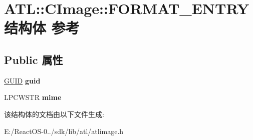 \hypertarget{struct_a_t_l_1_1_c_image_1_1_f_o_r_m_a_t___e_n_t_r_y}{}\section{A\+TL\+:\+:C\+Image\+:\+:F\+O\+R\+M\+A\+T\+\_\+\+E\+N\+T\+R\+Y结构体 参考}
\label{struct_a_t_l_1_1_c_image_1_1_f_o_r_m_a_t___e_n_t_r_y}
\subsection*{Public 属性}
\begin{DoxyCompactItemize}
\item 
\mbox{\label{struct_a_t_l_1_1_c_image_1_1_f_o_r_m_a_t___e_n_t_r_y_a31ce8a0d825a0e8574058a939a756bd2}} 
\hyperlink{interface_g_u_i_d}{G\+U\+ID} {\bfseries guid}
\item 
\mbox{\label{struct_a_t_l_1_1_c_image_1_1_f_o_r_m_a_t___e_n_t_r_y_ac5ea5c625100d24f097cd65be977cdd7}} 
L\+P\+C\+W\+S\+TR {\bfseries mime}
\end{DoxyCompactItemize}


该结构体的文档由以下文件生成\+:\begin{DoxyCompactItemize}
\item 
E\+:/\+React\+O\+S-\/0../sdk/lib/atl/atlimage.\+h\end{DoxyCompactItemize}
